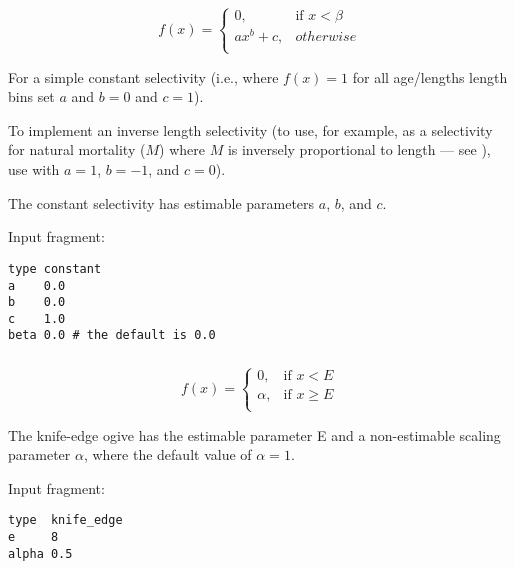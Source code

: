 \begin{equation}
f(x)= \begin{cases}
	0, & \text{if $x < \beta$} \\
	ax^b + c, & otherwise \\
\end{cases}
\end{equation}

For a simple constant selectivity (i.e., where $f(x) = 1$ for all \ifAgeBased age/lengths \else length bins \fi set $a$ and $b = 0$ and $c = 1$). 

To implement an inverse length selectivity (to use, for example, as a selectivity for natural mortality ($M$) where $M$ is inversely proportional to length --- see \cite{lorenzen_natural_2022}), use \ifAgeBased {} with \fi $a=1$, $b=-1$, and $c=0$).

The constant selectivity has estimable parameters $a$, $b$, and $c$.

Input fragment: {\small{\begin{verbatim}
type constant
a    0.0
b    0.0
c    1.0
beta 0.0 # the default is 0.0
\end{verbatim}}}

\subsubsection[Knife-edge]{}\label{sec:Selectivity-KnifeEdge} 

\begin{equation}
f(x)= \begin{cases}
  0, & \text{if $x < E$} \\
  \alpha, & \text{if $x \ge E$}\\
  \end{cases}
\end{equation}

The knife-edge ogive has the estimable parameter E and a non-estimable scaling parameter $\alpha$, where the default value of $\alpha = 1$.

Input fragment: {\small{\begin{verbatim}
type  knife_edge
e     8
alpha 0.5
\end{verbatim}}}

\subsubsection[All-values]{}\label{sec:Selectivity-AllValues}

